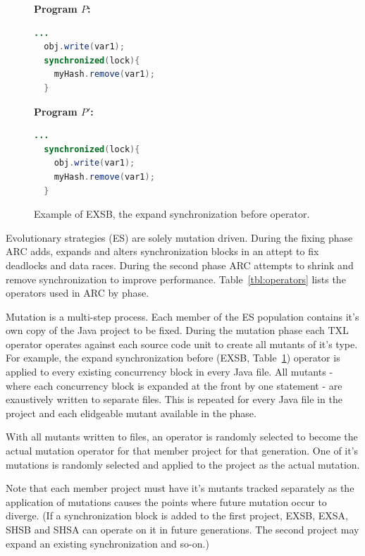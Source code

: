 \documentclass[10pt, conference, compsocconf]{IEEEtran}
\begin{document}
\begin{figure}[h!]
\vspace{2mm}
\begin{minipage}{3.70cm}

\footnotesize{\textbf{ Program $P$:}}
\begin{lstlisting}[language=Java]
  ...
  obj.write(var1);
  synchronized(lock){
    myHash.remove(var1);
  }
\end{lstlisting}
\end{minipage}\hfill
\begin{minipage}{3.70cm}
\footnotesize{\textbf{ Program $P'$:}}
\begin{lstlisting}[language=Java]
  ...
  synchronized(lock){
    obj.write(var1);
    myHash.remove(var1);
  }
\end{lstlisting}
\end{minipage}

\caption{Example of EXSB, the expand synchronization before operator.}
\label{fig:EXSBExample}
\end{figure}

Evolutionary strategies (ES) are solely mutation driven. During the fixing
phase ARC adds, expands and alters synchronization blocks in an attept to fix
deadlocks and data races. During the second phase ARC attempts to shrink and
remove synchronization to improve performance. Table~\ref{tbl:operators} lists
the operators used in ARC by phase. 

Mutation is a multi-step process. Each member of the ES population contains
it's own copy of the Java project to be fixed.  During the mutation phase each
TXL operator operates against each source code unit to create all mutants of
it's type. For example, the expand synchronization before (EXSB,
Table~\ref{fig:EXSBExample}) operator is applied to every existing concurrency
block in every Java file. All mutants - where each concurrency block is
expanded at the front by one statement - are exaustively written to separate
files. This is repeated for every Java file in the project and each elidgeable
mutant available in the phase.

With all mutants written to files, an operator is randomly selected to become
the actual mutation operator for that member project for that generation.  One
of it's mutations is randomly selected and applied to the project as the actual
mutation.

Note that each member project must have it's mutants tracked separately as the
application of mutations causes the points where future mutation occur to
diverge.  (If a synchronization block is added to the first project, EXSB,
EXSA, SHSB and SHSA can operate on it in future generations. The second project
may expand an existing synchronization and so-on.)
\end{document}
